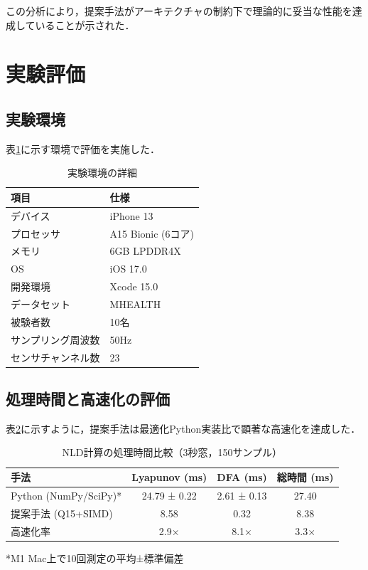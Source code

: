 \documentclass[paper]{ieicej}
\begin{document}
この分析により，提案手法がアーキテクチャの制約下で理論的に妥当な性能を達成していることが示された．

\section{実験評価}

\subsection{実験環境}

表\ref{tab:environment}に示す環境で評価を実施した．

\begin{table}[t]
\caption{実験環境の詳細}
\label{tab:environment}
\centering
\begin{tabular}{ll}
\toprule
項目 & 仕様 \\
\midrule
デバイス & iPhone 13 \\
プロセッサ & A15 Bionic (6コア) \\
メモリ & 6GB LPDDR4X \\
OS & iOS 17.0 \\
開発環境 & Xcode 15.0 \\
データセット & MHEALTH\cite{banos2014} \\
被験者数 & 10名 \\
サンプリング周波数 & 50Hz \\
センサチャンネル数 & 23 \\
\bottomrule
\end{tabular}
\end{table}

\subsection{処理時間と高速化の評価}

表\ref{tab:performance}に示すように，提案手法は最適化Python実装比で顕著な高速化を達成した．

\begin{table}[t]
\caption{NLD計算の処理時間比較（3秒窓，150サンプル）}
\label{tab:performance}
\centering
\begin{tabular}{lccc}
\toprule
手法 & Lyapunov (ms) & DFA (ms) & 総時間 (ms) \\
\midrule
Python (NumPy/SciPy)* & 24.79 ± 0.22 & 2.61 ± 0.13 & 27.40 \\
提案手法 (Q15+SIMD) & 8.58 & 0.32 & 8.38 \\
\midrule
高速化率 & 2.9× & 8.1× & 3.3× \\
\bottomrule
\end{tabular}
\vspace{1mm}
\footnotesize{*M1 Mac上で10回測定の平均±標準偏差}
\end{table}
\end{document}
